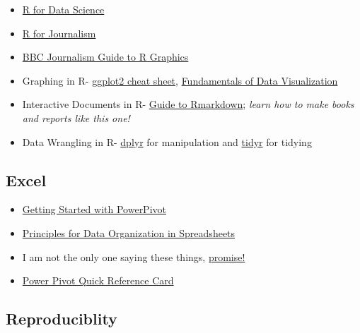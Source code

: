 \documentclass[]{book}
\providecommand{\tightlist}{%
  \setlength{\itemsep}{0pt}\setlength{\parskip}{0pt}}
\begin{document}
\begin{itemize}
\tightlist
\item
  \href{https://r4ds.had.co.nz/}{R for Data Science}
\item
  \href{https://learn.r-journalism.com/en/}{R for Journalism}
\item
  \href{https://bbc.github.io/rcookbook/}{BBC Journalism Guide to R Graphics}
\item
  Graphing in R- \href{https://rstudio.com/wp-content/uploads/2015/03/ggplot2-cheatsheet.pdf}{ggplot2 cheat sheet}, \href{https://serialmentor.com/dataviz/}{Fundamentals of Data Visualization}
\item
  Interactive Documents in R- \href{https://bookdown.org/yihui/rmarkdown/}{Guide to Rmarkdown}; \emph{learn how to make books and reports like this one!}
\item
  Data Wrangling in R- \href{https://dplyr.tidyverse.org/}{dplyr} for manipulation and \href{https://github.com/tyleransom/EconometricsLabs/blob/master/tidyRcheatsheet.pdf}{tidyr} for tidying
\end{itemize}

\hypertarget{excel}{%
\subsection{Excel}\label{excel}}

\begin{itemize}
\tightlist
\item
  \href{https://support.office.com/en-us/article/get-started-with-power-pivot-in-microsoft-excel-fdfcf944-7876-424a-8437-1a6c1043a80b}{Getting Started with PowerPivot}
\item
  \href{https://www.tandfonline.com/doi/full/10.1080/00031305.2017.1375989}{Principles for Data Organization in Spreadsheets}
\item
  I am not the only one saying these things, \href{https://towardsdatascience.com/microsoft-excel-in-the-era-of-big-data-401e67ca28a5}{promise!}
\item
  \href{https://powerpivotpro.com/2015/10/giving-back-steal-this-reference-card/\#downloads}{Power Pivot Quick Reference Card}
\end{itemize}

\hypertarget{reproduciblity}{%
\subsection{Reproduciblity}\label{reproduciblity}}
\end{document}
